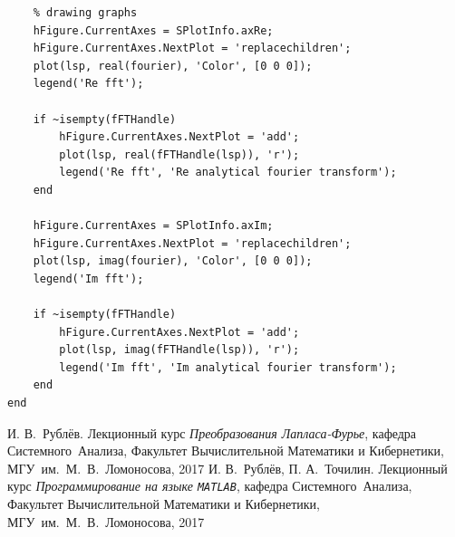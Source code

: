 \documentclass[11pt, oneside, draft]{article}
\numberwithin{equation}{section}
\begin{document}
\begin{verbatim}
    % drawing graphs
    hFigure.CurrentAxes = SPlotInfo.axRe;
    hFigure.CurrentAxes.NextPlot = 'replacechildren';
    plot(lsp, real(fourier), 'Color', [0 0 0]); 
    legend('Re fft');
 
    if ~isempty(fFTHandle) 
        hFigure.CurrentAxes.NextPlot = 'add';
        plot(lsp, real(fFTHandle(lsp)), 'r');
        legend('Re fft', 'Re analytical fourier transform');
    end

    hFigure.CurrentAxes = SPlotInfo.axIm;
    hFigure.CurrentAxes.NextPlot = 'replacechildren';
    plot(lsp, imag(fourier), 'Color', [0 0 0]);
    legend('Im fft');

    if ~isempty(fFTHandle) 
        hFigure.CurrentAxes.NextPlot = 'add';
        plot(lsp, imag(fFTHandle(lsp)), 'r');
        legend('Im fft', 'Im analytical fourier transform');
    end
end
    \end{verbatim}
    \begin{thebibliography}{0}
         И. В.~Рублёв. Лекционный курс \emph{Преобразования Лапласа-Фурье},
        кафедра Системного~Анализа, Факультет Вычислительной Математики и Кибернетики, МГУ~им.~М.~В.~Ломоносова, 
        2017
         И. В.~Рублёв, П. А.~Точилин. Лекционный курс \emph{Программирование на языке \texttt{MATLAB}},
        кафедра Системного~Анализа, Факультет Вычислительной Математики и Кибернетики, МГУ~им.~М.~В.~Ломоносова, 
        2017
    \end{thebibliography}
\end{document}
